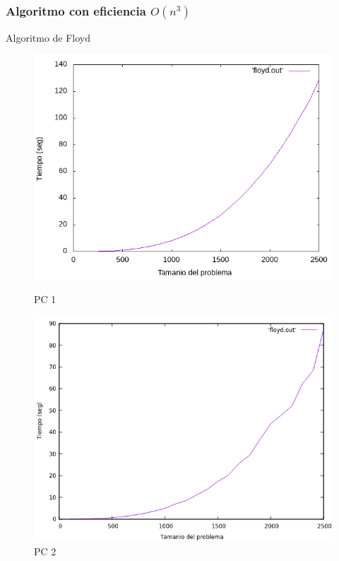 \documentclass{beamer}
\begin{document}
\subsubsection{Algoritmo con eficiencia $O(n^3)$}
\begin{frame}[fragile]{Algoritmo de Floyd}
\begin{figure}[H]
\centering
\begin{minipage}{.5\textwidth}
  \centering
  \includegraphics[width=\linewidth]{empirica_floyd.png}
   \caption*{PC 1}
\end{minipage}%
\begin{minipage}{.5\textwidth}
  \centering
  \includegraphics[width=\linewidth]{empirica_floyd_2.png}
  \caption*{PC 2}
\end{minipage}
\end{figure}
\end{frame}
\end{document}
